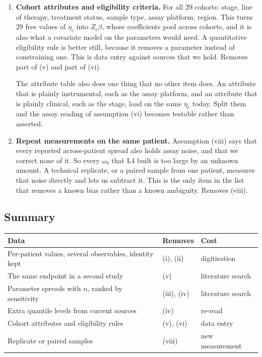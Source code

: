\documentclass[11pt]{article}
\begin{document}
\begin{enumerate}
\item \textbf{Cohort attributes and eligibility criteria.} For all $29$ cohorts:
stage, line of therapy, treatment status, sample type, assay platform, region.
This turns $29$ free values of $\eta_c$ into $Z_c\beta$, whose coefficients pool
across cohorts, and it is also what a covariate model on the parameters would
need. A quantitative eligibility rule is better still, because it removes a
parameter instead of constraining one. This is data entry against sources that we
hold. Removes part of (v) and part of (vi).

The attribute table also does one thing that no other item does. An attribute
that is plainly instrumental, such as the assay platform, and an attribute that
is plainly clinical, such as the stage, load on the same $\eta_c$ today. Split
them and the assay reading of assumption (vi) becomes testable rather than
asserted.

\item \textbf{Repeat measurements on the same patient.} Assumption (viii) says
that every reported across-patient spread also holds assay noise, and that we
correct none of it. So every $\omega_0$ that L4 built is too large by an unknown
amount. A technical replicate, or a paired sample from one patient, measures that
noise directly and lets us subtract it. This is the only item in the list that
removes a known bias rather than a known ambiguity. Removes (viii).
\end{enumerate}

\subsection{Summary}

\begin{center}\small
\begin{tabularx}{\textwidth}{@{}Xll@{}}
\toprule
Data & Removes & Cost \\
\midrule
Per-patient values, several observables, identity kept & (i), (ii) & digitisation \\
The same endpoint in a second study & (v) & literature search \\
Parameter spreads with $n$, ranked by sensitivity & (iii), (iv) & literature search \\
Extra quantile levels from current sources & (iv) & re-read \\
Cohort attributes and eligibility rules & (v), (vi) & data entry \\
Replicate or paired samples & (viii) & new measurement \\
\bottomrule
\end{tabularx}
\end{center}
\end{document}
